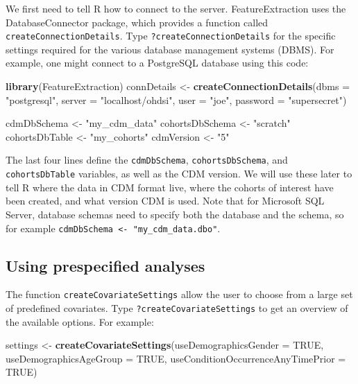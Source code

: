 \documentclass[11pt]{book}
\newenvironment{Shaded}{\begin{snugshade}}{\end{snugshade}}
\newcommand{\DataTypeTok}[1]{\textcolor[rgb]{0.13,0.29,0.53}{#1}}
\newcommand{\KeywordTok}[1]{\textcolor[rgb]{0.13,0.29,0.53}{\textbf{#1}}}
\newcommand{\NormalTok}[1]{#1}
\newcommand{\OtherTok}[1]{\textcolor[rgb]{0.56,0.35,0.01}{#1}}
\newcommand{\StringTok}[1]{\textcolor[rgb]{0.31,0.60,0.02}{#1}}
\theoremstyle{definition}
\theoremstyle{definition}
\theoremstyle{definition}
\theoremstyle{remark}
\begin{document}
We first need to tell R how to connect to the server. FeatureExtraction uses the DatabaseConnector package, which provides a function called \texttt{createConnectionDetails}. Type \texttt{?createConnectionDetails} for the specific settings required for the various database management systems (DBMS). For example, one might connect to a PostgreSQL database using this code:

\begin{Shaded}
\begin{Highlighting}[]
\KeywordTok{library}\NormalTok{(FeatureExtraction)}
\NormalTok{connDetails <-}\StringTok{ }\KeywordTok{createConnectionDetails}\NormalTok{(}\DataTypeTok{dbms =} \StringTok{"postgresql"}\NormalTok{,}
                                       \DataTypeTok{server =} \StringTok{"localhost/ohdsi"}\NormalTok{,}
                                       \DataTypeTok{user =} \StringTok{"joe"}\NormalTok{,}
                                       \DataTypeTok{password =} \StringTok{"supersecret"}\NormalTok{)}

\NormalTok{cdmDbSchema <-}\StringTok{ "my_cdm_data"}
\NormalTok{cohortsDbSchema <-}\StringTok{ "scratch"}
\NormalTok{cohortsDbTable <-}\StringTok{ "my_cohorts"}
\NormalTok{cdmVersion <-}\StringTok{ "5"}
\end{Highlighting}
\end{Shaded}

The last four lines define the \texttt{cdmDbSchema}, \texttt{cohortsDbSchema}, and \texttt{cohortsDbTable} variables, as well as the CDM version. We will use these later to tell R where the data in CDM format live, where the cohorts of interest have been created, and what version CDM is used. Note that for Microsoft SQL Server, database schemas need to specify both the database and the schema, so for example \texttt{cdmDbSchema\ \textless{}-\ "my\_cdm\_data.dbo"}.

\hypertarget{using-prespecified-analyses}{%
\subsection{Using prespecified analyses}\label{using-prespecified-analyses}}

The function \texttt{createCovariateSettings} allow the user to choose from a large set of predefined covariates. Type \texttt{?createCovariateSettings} to get an overview of the available options. For example:

\begin{Shaded}
\begin{Highlighting}[]
\NormalTok{settings <-}\StringTok{ }\KeywordTok{createCovariateSettings}\NormalTok{(}\DataTypeTok{useDemographicsGender =} \OtherTok{TRUE}\NormalTok{, }
                                    \DataTypeTok{useDemographicsAgeGroup =} \OtherTok{TRUE}\NormalTok{, }
                                    \DataTypeTok{useConditionOccurrenceAnyTimePrior =} \OtherTok{TRUE}\NormalTok{) }
\end{Highlighting}
\end{Shaded}
\end{document}
